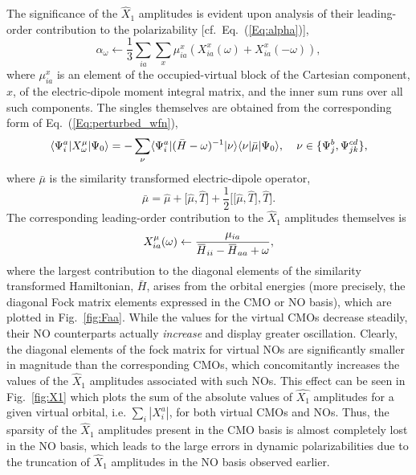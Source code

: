 \documentclass[11pt,article]{achemso}
\newcommand{\overbar}[1]{\mkern 2.2mu\overline{\mkern-2.2mu#1\mkern-2.2mu}\mkern 2.2mu}
\begin{document}
The significance of the $\hat{X}_1$ amplitudes is evident upon analysis of
their leading-order contribution to the polarizability [cf.\
Eq.~(\ref{Eq:alpha})],
\begin{equation}
\alpha_\omega \leftarrow \frac{1}{3} \sum\limits_{ia}\sum\limits_x \mu^{x}_{ia}(X^x_{ia}(\omega) +
X^x_{ia}(-\omega)),
\label{Eq:leading_X1}
\end{equation} 
where $\mu^x_{ia}$ is an element of the occupied-virtual block of the
Cartesian component, $x$, of the electric-dipole moment integral matrix, and the inner
sum runs over all such components. The singles
themselves are obtained from the corresponding form of
Eq.~(\ref{Eq:perturbed_wfn}),
\begin{equation} 
\langle\Psi^a_i|X^{\mu}_{\omega}|\Psi_0\rangle =
-\sum_{\nu}\langle\Psi^a_i|(\bar{H} -
\omega)^{-1}|\nu\rangle\langle\nu|\bar{\mu}|\Psi_0\rangle,
\hspace{0.15in}\nu
\in \{\Psi^b_j,\Psi^{cd}_{jk}\},
\label{Eq:singles}
\end{equation} 
where $\bar{\mu}$ is the similarity transformed electric-dipole operator,
\begin{equation}
\bar{\mu} = \hat{\mu} + \bigg[\hat{\mu},\hat{T}\bigg] +
\frac{1}{2}\bigg[\bigg[\hat{\mu},\hat{T}\bigg],\hat{T}\bigg].
\label{Eq:mubar}
\end{equation}
The corresponding leading-order contribution to the $\hat{X}_1$ amplitudes themselves is
\begin{equation}
X^{\mu}_{ia}(\omega) \leftarrow \frac{\mu_{ia}}{\overbar{H}_{ii} -
\overbar{H}_{aa} + \omega},
\label{Eq:X1}
\end{equation}
where the largest contribution to the diagonal elements of the similarity
transformed Hamiltonian, $\bar{H}$, arises from the orbital energies (more
precisely, the diagonal Fock matrix elements expressed in the CMO or NO
basis), which are plotted in Fig.~\ref{fig:Faa}.  While the values for the
virtual CMOs decrease steadily, their NO counterparts actually {\em increase}
and display greater oscillation.  Clearly, the diagonal elements of the fock
matrix for virtual NOs are significantly smaller in magnitude than the
corresponding CMOs, which concomitantly increases the values of the
$\hat{X}_1$ amplitudes associated with such NOs.  This effect can be seen in
Fig.~\ref{fig:X1} which plots the sum of the absolute values of $\hat{X_1}$
amplitudes for a given virtual orbital, i.e.  $\sum_i |X_i^a|$, for both
virtual CMOs and NOs.  Thus, the sparsity of the $\hat{X}_1$ amplitudes present in the
CMO basis is almost completely lost in the NO basis, which leads to the large
errors in dynamic polarizabilities due to the truncation of $\hat{X}_1$
amplitudes in the NO basis observed earlier.  
\end{document}
